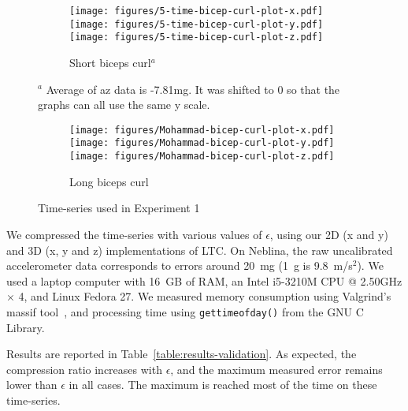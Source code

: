 \begin{figure*}
\centering
\begin{subfigure}{\columnwidth}
\centering
\texttt{[image: figures/5-time-bicep-curl-plot-x.pdf]}
\texttt{[image: figures/5-time-bicep-curl-plot-y.pdf]}
\texttt{[image: figures/5-time-bicep-curl-plot-z.pdf]}
\caption{Short biceps curl$^a$}
\end{subfigure}

{\footnotesize $^a$ Average
of az data is -7.81mg. It was shifted to 0 so that the graphs can all
use the same y scale.}

\begin{subfigure}{\columnwidth}
\centering
\texttt{[image: figures/Mohammad-bicep-curl-plot-x.pdf]}
\texttt{[image: figures/Mohammad-bicep-curl-plot-y.pdf]}
\texttt{[image: figures/Mohammad-bicep-curl-plot-z.pdf]}
\caption{Long biceps curl}
\end{subfigure}

\caption{Time-series used in Experiment 1}
\label{fig:datasets-1}
\end{figure*}

We compressed the time-series with various values of $\epsilon$, using
our 2D (x and y) and 3D (x, y and z) implementations of LTC. On
Neblina, the raw uncalibrated accelerometer data corresponds to errors
around 20~mg (1~g is 9.8~m/s$^2$). We used a
laptop computer with 16~GB of RAM, an Intel i5-3210M CPU @ 2.50GHz
$\times$ 4, and Linux Fedora 27. We measured memory consumption using
Valgrind's massif
tool~\cite{nethercote2006building},
and processing time using \texttt{gettimeofday()} from the GNU C
Library.

Results are reported in Table~\ref{table:results-validation}.
As expected, the compression ratio increases with $\epsilon$, and the
maximum measured error remains lower than $\epsilon$ in all cases. The
maximum is reached most of the time on these time-series.

